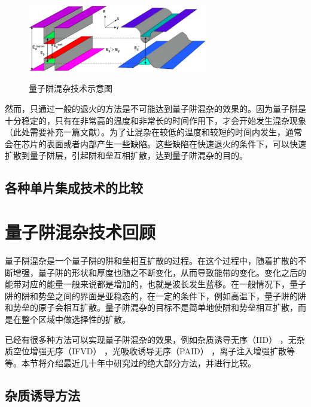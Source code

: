 \documentclass{ZJUthesis}
\begin{document}
\begin{figure}[!htb]
  \centering
  \includegraphics[width=0.7\textwidth]{./Pictures/qwi.eps}\\
  \caption{量子阱混杂技术示意图}
  \label{fig_qwi}
\end{figure}

然而，只通过一般的退火的方法是不可能达到量子阱混杂的效果的。因为量子阱是十分稳定的，只有在非常高的温度和非常长的时间作用下，才会开始发生混杂现象（此处需要补充一篇文献）。为了让混杂在较低的温度和较短的时间内发生，通常会在芯片的表面或者内部产生一些缺陷。这些缺陷在快速退火的条件下，可以快速扩散到量子阱层，引起阱和垒互相扩散，达到量子阱混杂的目的。

\subsection{各种单片集成技术的比较}

\section{量子阱混杂技术回顾}

量子阱混杂是一个量子阱的阱和垒相互扩散的过程。在这个过程中，随着扩散的不断增强，量子阱的形状和厚度也随之不断变化，从而导致能带的变化。变化之后的能带对应的能量一般来说都是增加的，也就是波长发生蓝移。在一般情况下，量子阱的阱和势垒之间的界面是亚稳态的，在一定的条件下，例如高温下，量子阱的阱和势垒的原子会相互扩散。量子阱混杂的目标不是简单地使阱和势垒相互扩散，而是在整个区域中做选择性的扩散。

已经有很多种方法可以实现量子阱混杂的效果，例如杂质诱导无序（IID） \cite{holonyak1998impurity-IID} ，无杂质空位增强无序（IFVD） \cite{si1998area-IFVD}，光吸收诱导无序（PAID） \cite{mckee1997monolithic-PAID}，离子注入增强扩散\cite{charbonneau1998photonic-implantation}等等。本节将介绍最近几十年中研究过的绝大部分方法，并进行比较。

\subsection{杂质诱导方法}
\end{document}
